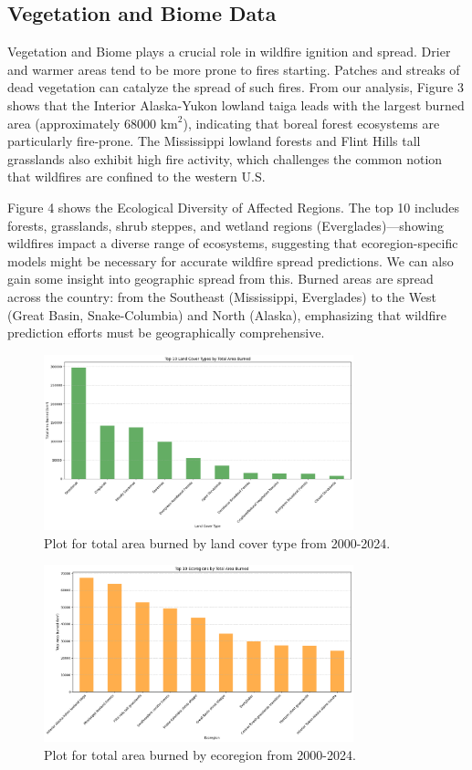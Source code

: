 \documentclass{article}
\begin{document}
\subsection{Vegetation and Biome Data}
Vegetation and Biome plays a crucial role in wildfire ignition and spread. Drier and warmer areas tend to be more prone to fires starting. Patches and streaks of dead vegetation can catalyze the spread of such fires. From our analysis, Figure 3 shows that the Interior Alaska-Yukon lowland taiga leads with the largest burned area (approximately $68000 \text{ km}^2$), indicating that boreal forest ecosystems are particularly fire-prone. The Mississippi lowland forests and Flint Hills tall grasslands also exhibit high fire activity, which challenges the common notion that wildfires are confined to the western U.S.

Figure 4 shows the Ecological Diversity of Affected Regions. The top 10 includes forests, grasslands, shrub steppes, and wetland regions (Everglades)—showing wildfires impact a diverse range of ecosystems, suggesting that ecoregion-specific models might be necessary for accurate wildfire spread predictions. We can also gain some insight into geographic spread from this. Burned areas are spread across the country: from the Southeast (Mississippi, Everglades) to the West (Great Basin, Snake-Columbia) and North (Alaska), emphasizing that wildfire prediction efforts must be geographically comprehensive.



\begin{figure}[htbp]
    \centering
    \includegraphics[width=0.8\textwidth]{img/land_cover.png}
    \caption{Plot for total area burned by land cover type from 2000-2024.}
    \label{fig:land_cover}
\end{figure}

\begin{figure}[htbp]
    \centering
    \includegraphics[width=0.8\textwidth]{img/ecoregions.png}
    \caption{Plot for total area burned by ecoregion from 2000-2024.}
    \label{fig:ecoregions}
\end{figure}



\end{document}
